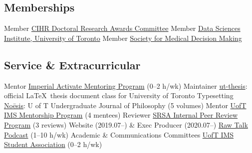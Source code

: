 \subsection{Memberships}
  {Member}
  {\href{https://cihr-irsc.gc.ca/e/48273.html}{CIHR Doctoral Research Awards Committee}}
  {Member}
  {\href{https://datasciences.utoronto.ca/}{Data Sciences Institute, University of Toronto}}
  {Member}
  {\href{https://smdm.org/}{Society for Medical Decision Making}}
\subsection{Service \& Extracurricular}
  {Mentor}
  {\href{https://www.imperial.ac.uk/students/academic-support/graduate-school/wellbeing-and-support/activate-student-mentoring-programme/}
        {Imperial Activate Mentoring Program} (0--2 h/wk)}
  {Maintainer}
  {\href{https://www.ctan.org/pkg/ut-thesis}{ut-thesis}: official \LaTeX\ thesis document class for University of Toronto}
  {Typesetting} %
  {\href{https://www.noesisjournal.com}{No\={e}sis}: U of T Undergraduate Journal of Philosophy (5 volumes)}
  {Mentor} %
  {\href{https://ims.utoronto.ca/ims-p2p-mentorship}{UofT IMS Mentorship Program} (4 mentees)}
  {Reviewer} %
  {\href{https://research.unityhealth.to/future-students-trainees/st-michaels-hospital-research-student-association}
        {SRSA Internal Peer Review Program} (3 reviews)}
  {Website \textnormal{(2019.07--)} \& Exec Producer \textnormal{(2020.07--)}}
  {\href{https://www.rawtalkpodcast.com}{Raw Talk Podcast} (1--10 h/wk)}
  {Academic \& Communications Committees}
  {\href{https://imssa.ca}{UofT IMS Student Association} (0--2 h/wk)}
